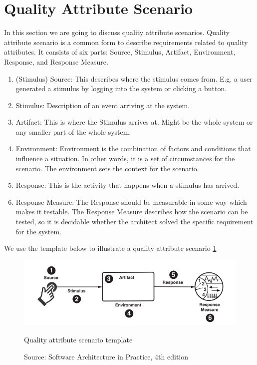 \section{Quality Attribute Scenario}
\label{sec:qas}
In this section we are going to discuss quality attribute scenarios. Quality attribute scenario is a common form to describe requirements related to quality attributes. It consists of six parts: Source, Stimulus, Artifact, Environment, Response, and Response Measure.
\begin{enumerate}
    \item (Stimulus) Source: This describes where the stimulus comes from. E.g. a user generated a stimulus by logging into the system or clicking a button.
    \item Stimulus: Description of an event arriving at the system.
    \item Artifact: This is where the Stimulus arrives at. Might be the whole system or any smaller part of the whole system.
    \item Environment: Environment is the combination of factors and conditions that influence a situation. In other words, it is a set of circumstances for the scenario. The environment sets the context for the scenario.
    \item Response: This is the activity that happens when a stimulus has arrived.
    \item Response Measure: The Response should be measurable in some way which makes it testable. The Response Measure describes how the scenario can be tested, so it is decidable whether the architect solved the specific requirement for the system.
\end{enumerate}
We use the template below to illustrate a quality attribute scenario \ref{fig:qa_scenario_template}
\begin{figure}[h]
\centering
  \includegraphics[width=\linewidth]{images/qa_scenario.png}
  \caption{Quality attribute scenario template}
  \caption*{Source: Software Architecture in Practice, 4th edition \cite{bass2021software}}
  \label{fig:qa_scenario_template}
\end{figure}

